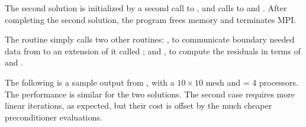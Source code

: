 The second solution is initialized by a second call to ,
and calls to  and .  After completing the
second solution, the program frees memory and terminates MPI.

The  routine simply calls two other routines: ,
to communicate boundary needed data from  to an extension of it called
; and , to compute the residuals in terms of
 and .

The following is a sample output from , with a $10 \times 10$
mesh and  = 4 processors.  The performance is similar for the two
solutions.  The second case requires more linear iterations, as expected, 
but their cost is offset by the much cheaper preconditioner evaluations.


